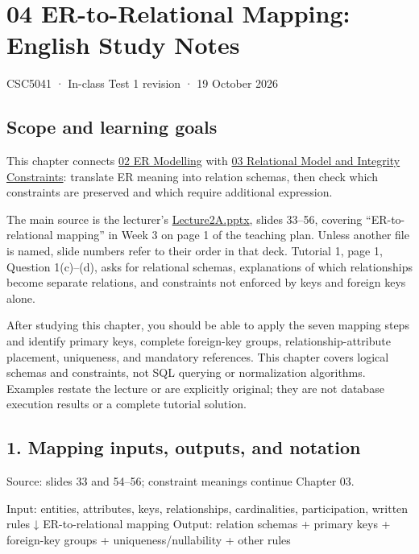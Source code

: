 \clearpage
\section{04 ER-to-Relational Mapping: English Study Notes}\label{04_er_to_relational_mapping_en}

CSC5041 · In-class Test 1 revision · 19 October 2026

\subsection{Scope and learning goals}\label{04_er_to_relational_mapping_en-scope-and-learning-goals}

This chapter connects \hyperref[02_er_modelling_en]{02 ER Modelling} with \hyperref[03_relational_model_and_integrity_en]{03 Relational Model and Integrity Constraints}: translate ER meaning into relation schemas, then check which constraints are preserved and which require additional expression.

The main source is the lecturer's \href{../../../slides/Lecture2A.pptx}{Lecture2A.pptx}, slides 33--56, covering ``ER-to-relational mapping'' in Week 3 on page 1 of the teaching plan. Unless another file is named, slide numbers refer to their order in that deck. Tutorial 1, page 1, Question 1(c)--(d), asks for relational schemas, explanations of which relationships become separate relations, and constraints not enforced by keys and foreign keys alone.

After studying this chapter, you should be able to apply the seven mapping steps and identify primary keys, complete foreign-key groups, relationship-attribute placement, uniqueness, and mandatory references. This chapter covers logical schemas and constraints, not SQL querying or normalization algorithms. Examples restate the lecture or are explicitly original; they are not database execution results or a complete tutorial solution.

\subsection{1. Mapping inputs, outputs, and notation}\label{04_er_to_relational_mapping_en-mapping-inputs-outputs-and-notation}

Source: slides 33 and 54--56; constraint meanings continue Chapter 03.

\begin{StudyCode}
Input: entities, attributes, keys, relationships, cardinalities, participation, written rules
  ↓ ER-to-relational mapping
Output: relation schemas + primary keys + foreign-key groups + uniqueness/nullability + other rules
\end{StudyCode}


